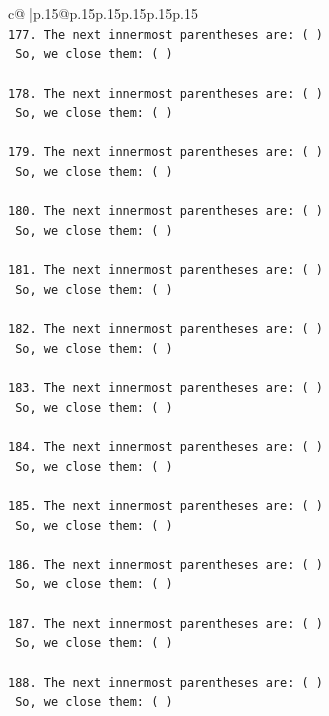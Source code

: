 \documentclass{article}
\begin{document}
{\begin{supertabular}{c@{$\;$}|p{.15\linewidth}@{}p{.15\linewidth}p{.15\linewidth}p{.15\linewidth}p{.15\linewidth}p{.15\linewidth}}
{{{\\ 
\texttt{177. The next innermost parentheses are: ( ) } \\
\texttt{    So, we close them: ( ) } \\
\\ 
\texttt{178. The next innermost parentheses are: ( ) } \\
\texttt{    So, we close them: ( ) } \\
\\ 
\texttt{179. The next innermost parentheses are: ( ) } \\
\texttt{    So, we close them: ( ) } \\
\\ 
\texttt{180. The next innermost parentheses are: ( ) } \\
\texttt{    So, we close them: ( ) } \\
\\ 
\texttt{181. The next innermost parentheses are: ( ) } \\
\texttt{    So, we close them: ( ) } \\
\\ 
\texttt{182. The next innermost parentheses are: ( ) } \\
\texttt{    So, we close them: ( ) } \\
\\ 
\texttt{183. The next innermost parentheses are: ( ) } \\
\texttt{    So, we close them: ( ) } \\
\\ 
\texttt{184. The next innermost parentheses are: ( ) } \\
\texttt{    So, we close them: ( ) } \\
\\ 
\texttt{185. The next innermost parentheses are: ( ) } \\
\texttt{    So, we close them: ( ) } \\
\\ 
\texttt{186. The next innermost parentheses are: ( ) } \\
\texttt{    So, we close them: ( ) } \\
\\ 
\texttt{187. The next innermost parentheses are: ( ) } \\
\texttt{    So, we close them: ( ) } \\
\\ 
\texttt{188. The next innermost parentheses are: ( ) } \\
\texttt{    So, we close them: ( ) } \\
}}}
\end{supertabular}}
\end{document}

